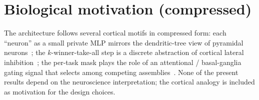\documentclass{article}
\theoremstyle{plain}
\theoremstyle{remark}
\begin{document}
\section{Biological motivation (compressed)}
\label{app:bio}
The architecture follows several cortical motifs in compressed form:
each ``neuron'' as a small private MLP mirrors the dendritic-tree view
of pyramidal neurons~\citep{poirazi2003pyramidal, beniaguev2021single};
the $k$-winner-take-all step is a discrete abstraction of cortical
lateral inhibition~\citep{maass2000computational, amari1977dynamics};
the per-task mask plays the role of an attentional / basal-ganglia
gating signal that selects among competing
assemblies~\citep{mink1996basal, schultz1997neural,
oreilly2006making}.  None of the present results depend on the
neuroscience interpretation; the cortical analogy is included as
motivation for the design choices.
\end{document}
